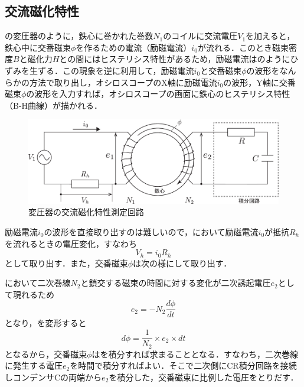 \subsection{交流磁化特性}
の変圧器のように，鉄心に巻かれた巻数$N_1$のコイルに交流電圧$V_1$を加えると，鉄心中に交番磁束$\phi$を作るための電流（励磁電流）$i_0$が流れる．このとき磁束密度$B$と磁化力$H$との間にはヒステリシス特性があるため，励磁電流はのようにひずみを生ずる．この現象を逆に利用して，励磁電流$i_0$と交番磁束$\phi$の波形をなんらかの方法で取り出し，オシロスコープのX軸に励磁電流$i_0$の波形，Y軸に交番磁束$\phi$の波形を入力すれば，オシロスコープの画面に鉄心のヒステリシス特性（B-H曲線）が描かれる．
\begin{figure}[htbp]
	\centering
	\includegraphics[width=140mm]{fig/transformer.pdf}
	\caption{変圧器の交流磁化特性測定回路}
	\label{fig:hys:transformer}
\end{figure}

励磁電流$i_0$の波形を直接取り出すのは難しいので，において励磁電流$i_0$が抵抗$R_h$を流れるときの電圧変化，すなわち
\begin{equation}
	V_h = i_0R_h
\end{equation}
として取り出す．また，交番磁束$\phi$は次の様にして取り出す．

において二次巻線$N_2$と鎖交する磁束の時間に対する変化が二次誘起電圧$e_2$として現れるため
\begin{equation}
	e_2 = -N_2\frac{d \phi}{dt}
	\label{eq:hys:e2}
\end{equation}
となり，を変形すると
\begin{equation}
	d \phi = \frac{1}{N_2}\times e_2\times dt
	\label{eq:hys:dphi}
\end{equation}
となるから，交番磁束$\phi$はを積分すれば求まることとなる．すなわち，二次巻線に発生する電圧$e_2$を時間で積分すればよい．そこで二次側にCR積分回路を接続しコンデンサCの両端から$e_2$を積分した，交番磁束に比例した電圧をとりだす．

